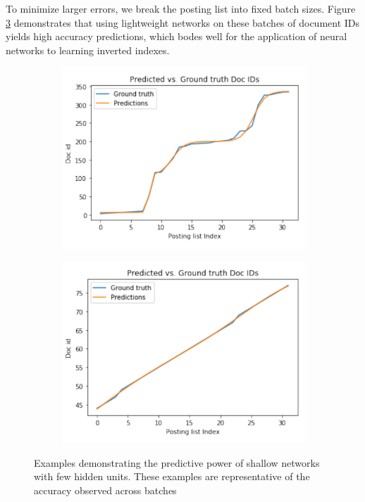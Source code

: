 \documentclass{article}
\begin{document}
To minimize larger errors, we break the posting list into fixed batch sizes. Figure \ref{fig:batch_learning} demonstrates that using lightweight networks on these batches of document IDs yields high accuracy predictions, which bodes well for the application of neural networks to learning inverted indexes.
\begin{figure}
\centering
\begin{subfigure}{0.5\textwidth}
    \includegraphics[width=\textwidth]{graphics/image1.pdf}
    \caption{}
    \label{fig:batch_1}
\end{subfigure}%
\begin{subfigure}{.5\textwidth}
    \includegraphics[width=\textwidth]{graphics/image2.pdf}
    \caption{}
    \label{fig:batch_2}
\end{subfigure}%
\caption{Examples demonstrating the predictive power of shallow networks with few hidden units.
These examples are representative of the accuracy observed across batches}
\label{fig:batch_learning}
\end{figure}
\end{document}
